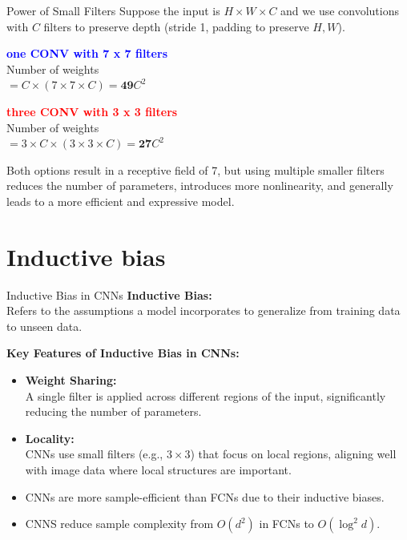 \documentclass[serif, aspectratio=169]{beamer}
\begin{document}
	\begin{frame}{Power of Small Filters}
		Suppose the input is $H \times W \times C$ and we use convolutions with $C$ filters to preserve depth (stride 1, padding to preserve $H, W$).
		
		\bigskip
		\begin{minipage}{0.45\textwidth}
			\textcolor{blue}{\textbf{one CONV with 7 x 7 filters}} \\
			Number of weights \\
			$= C \times (7 \times 7 \times C) = \textbf{49} C^2$
		\end{minipage}
		\hfill
		\begin{minipage}{0.45\textwidth}
			\textcolor{red}{\textbf{three CONV with 3 x 3 filters}} \\
			Number of weights \\
			$= 3 \times C \times (3 \times 3 \times C) = \textbf{27} C^2$
		\end{minipage}
		\bigskip
		\begin{flushleft}
			Both options result in a receptive field of 7, but using multiple smaller filters reduces the number of parameters, introduces more nonlinearity, and generally leads to a more efficient and expressive model.
		\end{flushleft}
	\end{frame}
	\section{Inductive bias}
	
		
	\begin{frame}{Inductive Bias in CNNs}
		\textbf{Inductive Bias:} \\
		Refers to the assumptions a model incorporates to generalize from training data to unseen data.
		
		\bigskip
		\textbf{Key Features of Inductive Bias in CNNs:}
		\begin{itemize}
			\item \textbf{Weight Sharing:} \\
			A single filter is applied across different regions of the input, significantly reducing the number of parameters.
			
			\item \textbf{Locality:} \\
			CNNs use small filters (e.g., $3 \times 3$) that focus on local regions, aligning well with image data where local structures are important.
			
			\item CNNs are more sample-efficient than FCNs due to their inductive biases.
			\item CNNS reduce sample complexity from $O(d^2)$ in FCNs to $O(\log^2 d)$.
		\end{itemize}
	\end{frame}
	
\end{document}
